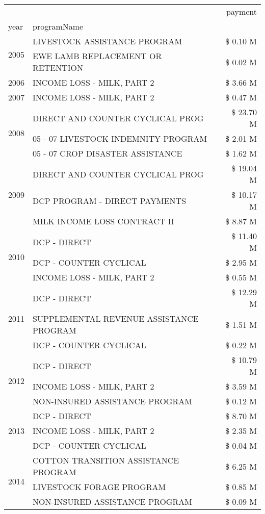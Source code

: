 \begin{tabular}{llr}
\toprule
 &  & payment \\
year & programName &  \\
\midrule
\multirow[t]{2}{*}{2005} & LIVESTOCK ASSISTANCE PROGRAM & \$ 0.10 M \\
 & EWE LAMB REPLACEMENT OR RETENTION & \$ 0.02 M \\
\cline{1-3}
2006 & INCOME LOSS - MILK, PART 2 & \$ 3.66 M \\
\cline{1-3}
2007 & INCOME LOSS - MILK, PART 2 & \$ 0.47 M \\
\cline{1-3}
\multirow[t]{3}{*}{2008} & DIRECT AND COUNTER CYCLICAL PROG & \$ 23.70 M \\
 & 05 - 07 LIVESTOCK INDEMNITY PROGRAM & \$ 2.01 M \\
 & 05 - 07 CROP DISASTER ASSISTANCE & \$ 1.62 M \\
\cline{1-3}
\multirow[t]{3}{*}{2009} & DIRECT AND COUNTER CYCLICAL PROG & \$ 19.04 M \\
 & DCP PROGRAM - DIRECT PAYMENTS & \$ 10.17 M \\
 & MILK INCOME LOSS CONTRACT II & \$ 8.87 M \\
\cline{1-3}
\multirow[t]{3}{*}{2010} & DCP - DIRECT & \$ 11.40 M \\
 & DCP - COUNTER CYCLICAL & \$ 2.95 M \\
 & INCOME LOSS - MILK, PART 2 & \$ 0.55 M \\
\cline{1-3}
\multirow[t]{3}{*}{2011} & DCP - DIRECT & \$ 12.29 M \\
 & SUPPLEMENTAL REVENUE ASSISTANCE PROGRAM & \$ 1.51 M \\
 & DCP - COUNTER CYCLICAL & \$ 0.22 M \\
\cline{1-3}
\multirow[t]{3}{*}{2012} & DCP - DIRECT & \$ 10.79 M \\
 & INCOME LOSS - MILK, PART 2 & \$ 3.59 M \\
 & NON-INSURED ASSISTANCE PROGRAM & \$ 0.12 M \\
\cline{1-3}
\multirow[t]{3}{*}{2013} & DCP - DIRECT & \$ 8.70 M \\
 & INCOME LOSS - MILK, PART 2 & \$ 2.35 M \\
 & DCP - COUNTER CYCLICAL & \$ 0.04 M \\
\cline{1-3}
\multirow[t]{3}{*}{2014} & COTTON TRANSITION ASSISTANCE PROGRAM & \$ 6.25 M \\
 & LIVESTOCK FORAGE PROGRAM & \$ 0.85 M \\
 & NON-INSURED ASSISTANCE PROGRAM & \$ 0.09 M \\

\end{tabular}
